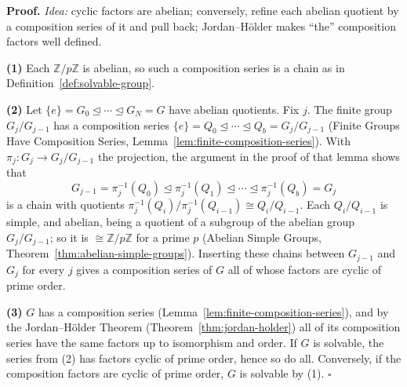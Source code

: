 \documentclass[11pt]{report}
\renewenvironment{proof}[1][Proof]{\noindent\textbf{#1.} }{\hfill$\square$\par\vspace{5pt}}
\begin{document}
\begin{proof}
\textit{Idea:} cyclic factors are abelian; conversely, refine each abelian quotient by a composition series of it and pull back; Jordan--H\"older makes ``the'' composition factors well defined.\par
\textbf{(1)} Each $\mathbb{Z}/p\mathbb{Z}$ is abelian, so such a composition series is a chain as in Definition~\ref{def:solvable-group}.

\textbf{(2)} Let $\{e\} = G_0 \trianglelefteq \cdots \trianglelefteq G_N = G$ have abelian quotients. Fix $j$. The finite group $G_j/G_{j-1}$ has a composition series $\{e\} = Q_0 \trianglelefteq \cdots \trianglelefteq Q_b = G_j/G_{j-1}$ (Finite Groups Have Composition Series, Lemma~\ref{lem:finite-composition-series}). With $\pi_j: G_j \to G_j/G_{j-1}$ the projection, the argument in the proof of that lemma shows that
\[ G_{j-1} = \pi_j^{-1}(Q_0) \trianglelefteq \pi_j^{-1}(Q_1) \trianglelefteq \cdots \trianglelefteq \pi_j^{-1}(Q_b) = G_j \]
is a chain with quotients $\pi_j^{-1}(Q_i)/\pi_j^{-1}(Q_{i-1}) \cong Q_i/Q_{i-1}$. Each $Q_i/Q_{i-1}$ is simple, and abelian, being a quotient of a subgroup of the abelian group $G_j/G_{j-1}$; so it is $\cong \mathbb{Z}/p\mathbb{Z}$ for a prime $p$ (Abelian Simple Groups, Theorem~\ref{thm:abelian-simple-groups}). Inserting these chains between $G_{j-1}$ and $G_j$ for every $j$ gives a composition series of $G$ all of whose factors are cyclic of prime order.

\textbf{(3)} $G$ has a composition series (Lemma~\ref{lem:finite-composition-series}), and by the Jordan--H\"older Theorem (Theorem~\ref{thm:jordan-holder}) all of its composition series have the same factors up to isomorphism and order. If $G$ is solvable, the series from (2) has factors cyclic of prime order, hence so do all. Conversely, if the composition factors are cyclic of prime order, $G$ is solvable by (1).
\end{proof}
\end{document}
